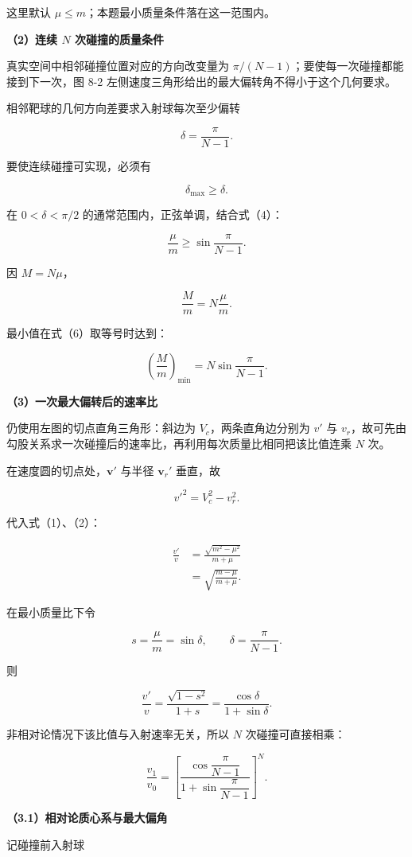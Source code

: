 \documentclass[12pt,a4paper,UTF8]{ctexart}
\begin{document}
这里默认 \(\mu\leq m\)；本题最小质量条件落在这一范围内。

\textbf{（2）连续 \(N\) 次碰撞的质量条件}

真实空间中相邻碰撞位置对应的方向改变量为
\(\pi/(N-1)\)；要使每一次碰撞都能接到下一次，图 8-2
左侧速度三角形给出的最大偏转角不得小于这个几何要求。

相邻靶球的几何方向差要求入射球每次至少偏转

\[\delta=\frac{\pi}{N-1}.\]

要使连续碰撞可实现，必须有

\[\delta_{\max}\geq\delta.\]

在 \(0<\delta<\pi/2\) 的通常范围内，正弦单调，结合式（4）：

\[\frac\mu m\geq\sin\frac{\pi}{N-1}.\]

因 \(M=N\mu\)，

\[\frac Mm=N\frac\mu m.\]

最小值在式（6）取等号时达到：

\[\boxed{
\left(\frac Mm\right)_{\min}
=N\sin\frac{\pi}{N-1}}.\]

\textbf{（3）一次最大偏转后的速率比}

仍使用左图的切点直角三角形：斜边为 \(V_c\)，两条直角边分别为 \(v'\) 与
\(v_r\)，故可先由勾股关系求一次碰撞后的速率比，再利用每次质量比相同把该比值连乘
\(N\) 次。

在速度圆的切点处，\(\bm v'\) 与半径 \(\bm v_r'\) 垂直，故

\[v'^2=V_c^2-v_r^2.\]

代入式（1）、（2）：

\[\begin{aligned}
\frac{v'}v
&=\frac{\sqrt{m^2-\mu^2}}{m+\mu}\\
&=\sqrt{\frac{m-\mu}{m+\mu}}.
\end{aligned}\]

在最小质量比下令

\[s=\frac\mu m=\sin\delta,
\qquad \delta=\frac{\pi}{N-1}.\]

则

\[\frac{v'}v=\frac{\sqrt{1-s^2}}{1+s}
=\frac{\cos\delta}{1+\sin\delta}.\]

非相对论情况下该比值与入射速率无关，所以 \(N\) 次碰撞可直接相乘：

\[\boxed{
\frac{v_1}{v_0}
=\left[
\frac{\cos\dfrac{\pi}{N-1}}
{1+\sin\dfrac{\pi}{N-1}}
\right]^N}.\]

\textbf{（3.1）相对论质心系与最大偏角}

记碰撞前入射球
\end{document}
